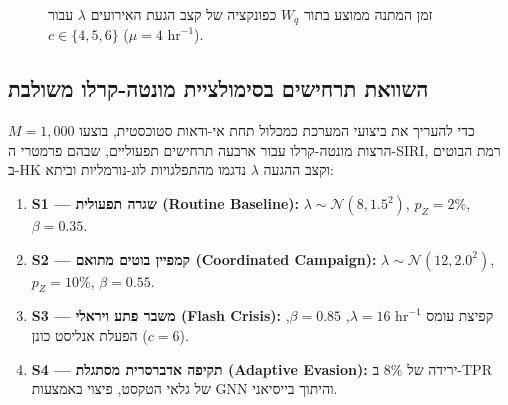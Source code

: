 \begin{figure}[htbp]
\centering
\begin{english}
\end{english}
\caption{זמן המתנה ממוצע בתור $W_q$ כפונקציה של קצב הגעת האירועים $\lambda$ עבור $c \in \{4,5,6\}$ ($\mu=4\text{ hr}^{-1}$).}
\label{fig:mmc-latency}
\end{figure}

\subsection{השוואת תרחישים בסימולציית מונטה-קרלו משולבת}
\label{subsec:monte-carlo}

כדי להעריך את ביצועי המערכת כמכלול תחת אי-ודאות סטוכסטית, בוצעו $M = 1{,}000$ הרצות מונטה-קרלו עבור ארבעה תרחישים תפעוליים, שבהם פרמטרי ה-\textenglish{SIRI}, רמת הבוטים ב-\textenglish{HK} וקצב ההגעה $\lambda$ נדגמו מהתפלגויות לוג-נורמליות וביתא:
\begin{enumerate}
    \item \textbf{S1 --- שגרה תפעולית (\textenglish{Routine Baseline}):} $\lambda \sim \mathcal{N}(8, 1.5^2)$, $p_Z = 2\%$, $\beta = 0.35$.
    \item \textbf{S2 --- קמפיין בוטים מתואם (\textenglish{Coordinated Campaign}):} $\lambda \sim \mathcal{N}(12, 2.0^2)$, $p_Z = 10\%$, $\beta = 0.55$.
    \item \textbf{S3 --- משבר פתע ויראלי (\textenglish{Flash Crisis}):} קפיצת עומס $\lambda = 16\text{ hr}^{-1}$, $\beta = 0.85$, הפעלת אנליסט כונן ($c=6$).
    \item \textbf{S4 --- תקיפה אדברסרית מסתגלת (\textenglish{Adaptive Evasion}):} ירידה של $8\%$ ב-\textenglish{TPR} של גלאי הטקסט, פיצוי באמצעות \textenglish{GNN} והיתוך בייסיאני.
\end{enumerate}

